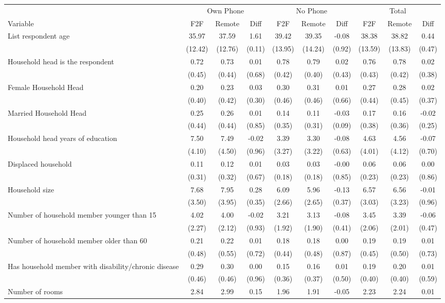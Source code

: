 \begin{tabular}{l*{9}c}
\hline\hline
 & \multicolumn{3}{c}{Own Phone} & \multicolumn{3}{c}{No Phone} & \multicolumn{3}{c}{Total}\\ 
Variable & F2F & Remote & Diff & F2F & Remote & Diff & F2F & Remote & Diff \\
\hline
List respondent age&35.97&37.59&1.61&39.42&39.35&-0.08&38.38&38.82&0.44\\
&(12.42)&(12.76)&(0.11)&(13.95)&(14.24)&(0.92)&(13.59)&(13.83)&(0.47)\\
Household head is the respondent&0.72&0.73&0.01&0.78&0.79&0.02&0.76&0.78&0.02\\
&(0.45)&(0.44)&(0.68)&(0.42)&(0.40)&(0.43)&(0.43)&(0.42)&(0.38)\\
Female Household Head&0.20&0.23&0.03&0.30&0.31&0.01&0.27&0.28&0.02\\
&(0.40)&(0.42)&(0.30)&(0.46)&(0.46)&(0.66)&(0.44)&(0.45)&(0.37)\\
Married Household Head&0.25&0.26&0.01&0.14&0.11&-0.03&0.17&0.16&-0.02\\
&(0.44)&(0.44)&(0.85)&(0.35)&(0.31)&(0.09)&(0.38)&(0.36)&(0.25)\\
Household head years of education&7.50&7.49&-0.02&3.39&3.30&-0.08&4.63&4.56&-0.07\\
&(4.10)&(4.50)&(0.96)&(3.27)&(3.22)&(0.63)&(4.01)&(4.12)&(0.70)\\
Displaced household&0.11&0.12&0.01&0.03&0.03&-0.00&0.06&0.06&0.00\\
&(0.31)&(0.32)&(0.67)&(0.18)&(0.18)&(0.85)&(0.23)&(0.23)&(0.86)\\
Household size&7.68&7.95&0.28&6.09&5.96&-0.13&6.57&6.56&-0.01\\
&(3.50)&(3.95)&(0.35)&(2.66)&(2.65)&(0.37)&(3.03)&(3.23)&(0.96)\\
Number of household member younger than 15&4.02&4.00&-0.02&3.21&3.13&-0.08&3.45&3.39&-0.06\\
&(2.27)&(2.12)&(0.93)&(1.92)&(1.90)&(0.41)&(2.06)&(2.01)&(0.47)\\
Number of household member older than 60&0.21&0.22&0.01&0.18&0.18&0.00&0.19&0.19&0.01\\
&(0.48)&(0.55)&(0.72)&(0.44)&(0.48)&(0.87)&(0.45)&(0.50)&(0.73)\\
Has household member with disability/chronic disease&0.29&0.30&0.00&0.15&0.16&0.01&0.19&0.20&0.01\\
&(0.46)&(0.46)&(0.96)&(0.36)&(0.37)&(0.50)&(0.40)&(0.40)&(0.59)\\
Number of rooms&2.84&2.99&0.15&1.96&1.91&-0.05&2.23&2.24&0.01\\

\end{tabular}
